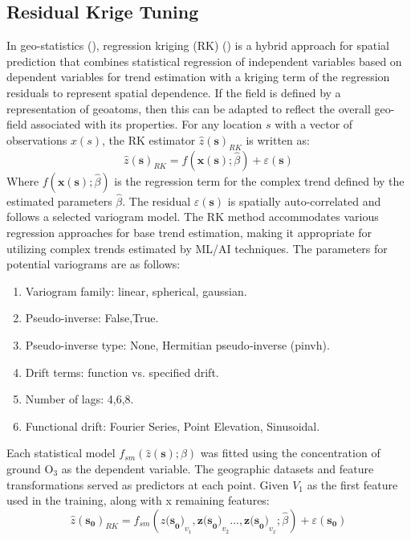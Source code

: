 \subsection{Residual Krige Tuning} \label{methods:rkt} In geo-statistics (\cite{oliver_tutorial_2014}), regression kriging (RK) (\cite{chiles_fifty_2018}) is a hybrid approach for spatial prediction that combines statistical regression of independent variables based on dependent variables for trend estimation with a kriging term of the regression residuals to represent spatial dependence. If the field is defined by a representation of geoatoms, then this can be adapted to reflect the overall geo-field associated with its properties. For any location $s$ with a vector of observations $x(s)$, the RK estimator $\hat{z}{(\mathbf{s})}_{RK}$ is written as:
\[
\hat{z}{(\mathbf{s})}_{RK}=f\left(\mathbf{x}\left(\mathbf{s}\right);\hat{\beta}\right)+\varepsilon(\mathbf{s})
\]
Where $f\left(\mathbf{x}\left(\mathbf{s}\right);\hat{\beta}\right)$ is the regression term for the complex trend defined by the estimated parameters $\hat{\beta}$. The residual $\varepsilon\left(\mathbf{s}\right)$ is spatially auto-correlated and follows a selected variogram model. The RK method accommodates various regression approaches for base trend estimation, making it appropriate for utilizing complex trends estimated by ML/AI techniques. The parameters for potential variograms are as follows:
\begin{enumerate}
    \item{Variogram family:} linear, spherical, gaussian.
    \item{Pseudo-inverse:} False,True.
    \item{Pseudo-inverse type:} None, Hermitian pseudo‑inverse (pinvh).
    \item{Drift terms:} function vs. specified drift.
    \item{Number of lags:} 4,6,8.
    \item{Functional drift:} Fourier Series, Point Elevation, Sinusoidal.
\end{enumerate}
Each statistical model $f_{sm}(\hat{z}\left(\mathbf{s}\right);\beta)$ was fitted using the concentration of ground O$_3$ as the dependent variable. The geographic datasets and feature transformations served as predictors at each point. Given $V_1$ as the first feature used in the training, along with x remaining features:
\[
\hat{z}{(\mathbf{s}_\mathbf{0})}_{RK}=f_{sm}\left({{z}{(\mathbf{s}}_\mathbf{0})}_{v_1},{\mathbf{z}{(\mathbf{s}}_\mathbf{0})}_{v_2}\ldots,{\mathbf{z}{(\mathbf{s}}_\mathbf{0})}_{v_x};\hat{\beta}\right)+\varepsilon(\mathbf{s}_\mathbf{0})
\]
